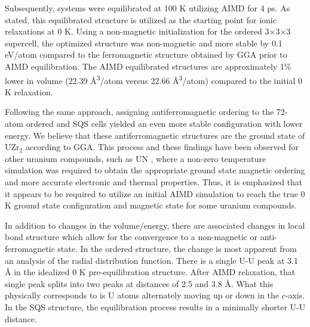 \documentclass[preprint,12pt]{elsarticle}
\begin{document}
Subsequently, systems were equilibrated at 100 K utilizing AIMD for 4 ps. As stated, this equilibrated structure is utilized as the starting point for ionic relaxations at 0 K. Using a non-magnetic initialization for the ordered 3$\times$3$\times$3 supercell, the optimized structure was non-magnetic and more stable by 0.1 eV/atom compared to the ferromagnetic structure obtained by GGA prior to AIMD equilibration. The AIMD equilibrated structures are approximately 1\% lower in volume (22.39 {\AA}\textsuperscript{3}/atom versus 22.66 {\AA}\textsuperscript{3}/atom) compared to the initial 0 K relaxation. %


Following the same approach, assigning antiferromagnetic ordering to the 72-atom ordered and SQS cells yielded an even more stable configuration with lower energy. We believe that these antiferromagnetic structures are the ground state of UZr$_2$ according to GGA. This process and these findings have been observed for other uranium compounds, such as UN \cite{kocevski_finite_2023}, where a non-zero temperature simulation was required to obtain the appropriate ground state magnetic ordering and more accurate electronic and thermal properties. Thus, it is emphasized that it appears to be required to utilize an initial AIMD simulation to reach the true 0 K ground state configuration and magnetic state for some uranium compounds. 

In addition to changes in the volume/energy, there are associated changes in local bond structure which allow for the convergence to a non-magnetic or anti-ferromagnetic state. In the ordered structure, the change is most apparent from an analysis of the radial distribution function. There is a single U-U peak at 3.1 {\AA} in the idealized 0 K pre-equilibration structure. After AIMD relaxation, that single peak splits into two peaks at distances of 2.5 and 3.8 {\AA}. What this physically corresponds to is U atoms alternately moving up or down in the $c$-axis. In the SQS structure, the equilibration process results in a minimally shorter U-U distance.

\end{document}
